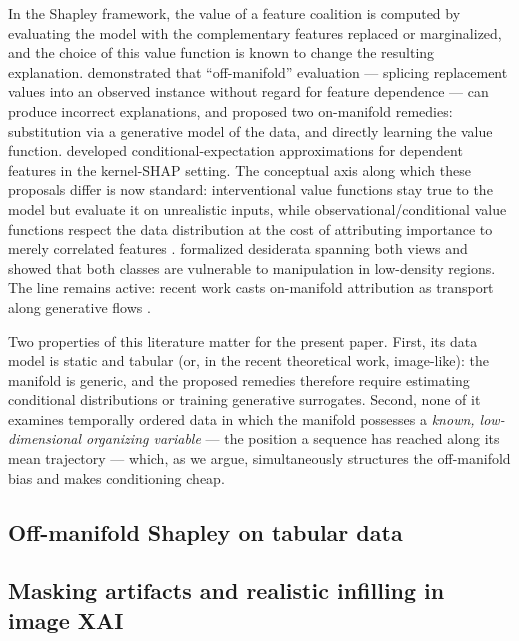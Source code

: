 \documentclass{article}
\begin{document}
In the Shapley framework, the value of a feature coalition is computed by evaluating the model with the complementary features replaced or marginalized, and the choice of this value function is known to change the resulting explanation. \citet{frye2021shapley} demonstrated that ``off-manifold'' evaluation --- splicing replacement values into an observed instance without regard for feature dependence --- can produce incorrect explanations, and proposed two on-manifold remedies: substitution via a generative model of the data, and directly learning the value function. \citet{aas2021explaining} developed conditional-expectation approximations for dependent features in the kernel-SHAP setting. The conceptual axis along which these proposals differ is now standard: interventional value functions stay true to the model but evaluate it on unrealistic inputs, while observational/conditional value functions respect the data distribution at the cost of attributing importance to merely correlated features \citep{chen2020true, janzing2020feature, sundararajan2020many}. \citet{yeh2022threading} formalized desiderata spanning both views and showed that both classes are vulnerable to manipulation in low-density regions. The line remains active: recent work casts on-manifold attribution as transport along generative flows \citep{zhang2026axiomatic}.
 
Two properties of this literature matter for the present paper. First, its data model is static and tabular (or, in the recent theoretical work, image-like): the manifold is generic, and the proposed remedies therefore require estimating conditional distributions or training generative surrogates. Second, none of it examines temporally ordered data in which the manifold possesses a \emph{known, low-dimensional organizing variable} --- the position a sequence has reached along its mean trajectory --- which, as we argue, simultaneously structures the off-manifold bias and makes conditioning cheap.
 

\subsection{Off-manifold Shapley on tabular data}\label{sec:related:tabular}

\subsection{Masking artifacts and realistic infilling in image XAI}\label{sec:related:image}
\end{document}
